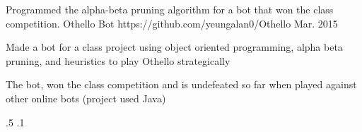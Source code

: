 \begin{cventries}






\vspace{-1.25em}
\myProject
{Programmed the alpha-beta pruning algorithm for a bot that won the class competition.} %
{Othello Bot} %
{https://github.com/yeungalan0/Othello} %
{Mar. 2015} %
{ %
\begin{cvitems}
\item {Made a bot for a class project using object oriented programming, alpha beta pruning, and heuristics to play Othello strategically}
\item {The bot, won the class competition and is undefeated so far when played against other online bots (project used Java)}
\end{cvitems}
}
{.5}
{.1}


\end{cventries}
